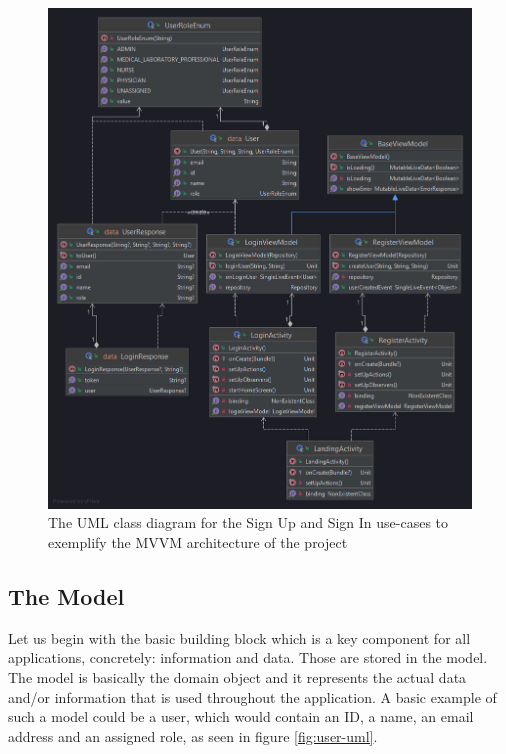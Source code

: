 \begin{figure}
\centering
\includegraphics[width=\textwidth]{figures/mvvm_project_example.png}
\caption{The UML class diagram for the Sign Up and Sign In use-cases to exemplify the MVVM architecture of the project}
\label{fig:mvvm-project-example}
\end{figure}

\subsection{The Model}
\label{subsec:ch3sec1subsec1}

\par Let us begin with the basic building block which is a key component for all applications, concretely: information and data. Those are stored in the model. The model is basically the domain object and it represents the actual data and/or information that is used throughout the application. A basic example of such a model could be a user, which would contain an ID, a name, an email address and an assigned role, as seen in figure \ref{fig:user-uml}.

